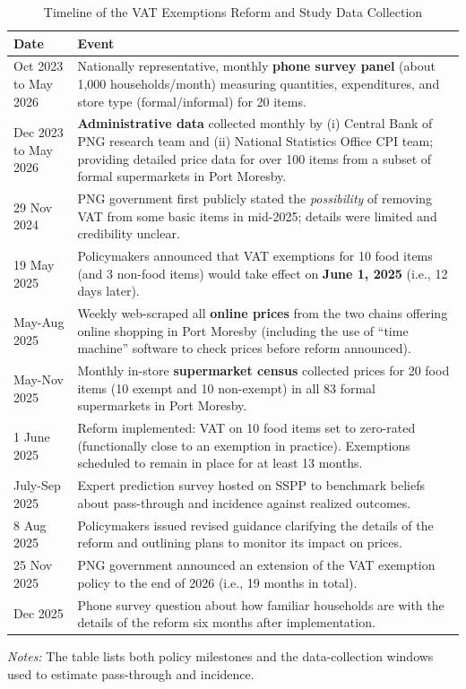 \documentclass[12pt]{article}
\begin{document}
\begin{table}[H]\centering
\caption{Timeline of the VAT Exemptions Reform and Study Data Collection}
\label{tab:timeline_vat_exemptions}
\begin{tabular}{p{2.6cm} p{11.6cm}}
\hline\hline
\textbf{Date} & \textbf{Event} \\
\hline
Oct 2023 to May 2026 & Nationally representative, monthly \textbf{phone survey panel} (about 1,000 households/month) measuring quantities, expenditures, and store type (formal/informal) for 20 items.\\[2pt]
Dec 2023 to May 2026 & \textbf{Administrative data} collected monthly by (i) Central Bank of PNG research team and (ii) National Statistics Office CPI team; providing detailed price data for over 100 items from a subset of formal supermarkets in Port Moresby. \\[2pt]
29 Nov 2024 & PNG government first publicly stated the \emph{possibility} of removing VAT from some basic items in mid-2025; details were limited and credibility unclear. \\[2pt]
19 May 2025 & Policymakers announced that VAT exemptions for 10 food items (and 3 non-food items) would take effect on \textbf{June 1, 2025} (i.e., 12 days later). \\[2pt]
May-Aug 2025 & Weekly web-scraped all \textbf{online prices} from the two chains offering online shopping in Port Moresby (including the use of ``time machine'' software to check prices before reform announced).\\[2pt]
May-Nov 2025 & Monthly in-store \textbf{supermarket census} collected prices for 20 food items (10 exempt and 10 non-exempt) in all 83 formal supermarkets in Port Moresby.  \\[2pt]
1 June 2025 & Reform implemented: VAT on 10 food items set to zero-rated (functionally close to an exemption in practice). Exemptions scheduled to remain in place for at least 13 months. \\[2pt]
July-Sep 2025 & Expert prediction survey hosted on SSPP to benchmark beliefs about pass-through and incidence against realized outcomes. \\[2pt]
8 Aug 2025 & Policymakers issued revised guidance clarifying the details of the reform and outlining plans to monitor its impact on prices. \\[2pt]
25 Nov 2025 & PNG government announced an extension of the VAT exemption policy to the end of 2026 (i.e., 19 months in total). \\[2pt]
Dec 2025 & Phone survey question about how familiar households are with the details of the reform six months after implementation. \\
\hline\hline
\end{tabular}
\begin{flushleft}
\footnotesize \textit{Notes:} The table lists both policy milestones and the data-collection windows used to estimate pass-through and incidence.
\end{flushleft}
\end{table}
\end{document}
